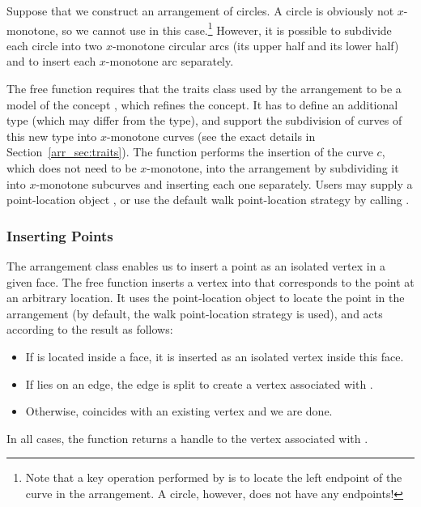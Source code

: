 Suppose that we construct an arrangement of circles. A circle is
obviously not $x$-monotone, so we cannot use
 in this case.\footnote{Note that a key
operation performed by  is to locate the
left endpoint of the curve in the arrangement. A circle, however, does
not have any endpoints!} However, it is possible to subdivide each circle
into two $x$-monotone circular arcs (its upper half and its lower
half) and to insert each $x$-monotone arc separately.

The free function  requires that the traits class
used by the arrangement  to be a model of the concept
, which refines the
 concept. It has to define an
additional  type (which may differ from the
 type), and support the subdivision of curves
of this new type into $x$-monotone curves (see the exact details in
Section~\ref{arr_sec:traits}). The 
function performs the insertion of the curve $c$, which does not need
to be $x$-monotone, into the arrangement by subdividing it into
$x$-monotone subcurves and inserting each one separately. Users
may supply a point-location object , or use the default
walk point-location strategy by calling .

\subsubsection{Inserting Points}
\label{arr_sssec:insert_point}
%
The arrangement class enables us to insert a point as an isolated
vertex in a given face. The free function
 inserts a vertex into  that
corresponds to the point  at an arbitrary location. It uses
the point-location object  to locate the point in the
arrangement (by default, the walk point-location strategy is used),
and acts according to the result as follows:
\begin{itemize}
\item If  is located inside a face, it is inserted as an
isolated vertex inside this face.
\item If  lies on an edge, the edge is split to create a
vertex associated with .
\item Otherwise,  coincides with an existing vertex and
we are done.
\end{itemize}
In all cases, the function returns a handle to the vertex
associated with .

